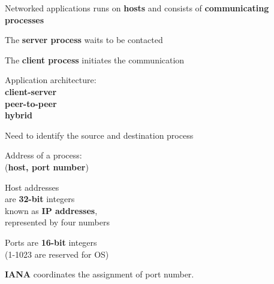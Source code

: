 \begin{cf}{
	Networked applications runs on \textbf{hosts} and consists of \textbf{communicating processes}
}
\end{cf}

\begin{cf}{
	The \textbf{server process} waits to be contacted
}
\end{cf}

\begin{cf}{
	The \textbf{client process} initiates the communication
}
\end{cf}

\begin{cf}{
	Application architecture: \\
		\textbf{client-server}\\
		\textbf{peer-to-peer}\\
		\textbf{hybrid}\\
}
\end{cf}

\begin{cf}{
	Need to identify the source and destination process
}
\end{cf}

\begin{cf}{
	Address of a process:\\
		(\textbf{host, port number})
}
\end{cf}

\begin{cf}{
	Host addresses\\ are \textbf{32-bit} integers\\
	known as \textbf{IP addresses},\\
	represented by four numbers
}
\end{cf}

\begin{cf}{
	Ports are \textbf{16-bit} integers\\
	(1-1023 are reserved for OS)
}
\end{cf}

\begin{cf}{
	\textbf{IANA} coordinates the assignment of port number.
}
\end{cf}

